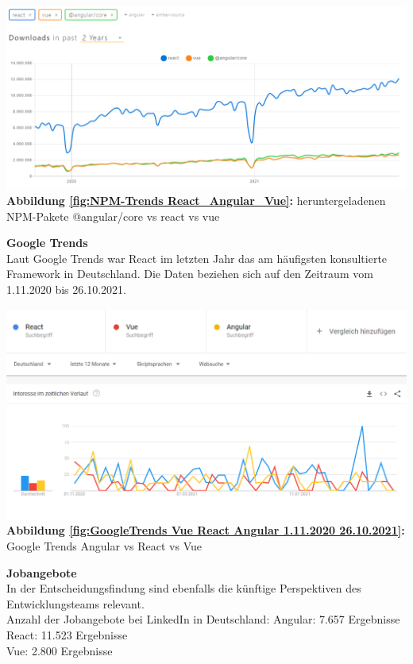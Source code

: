 \begin{center}
  \includegraphics[scale=0.4]{sources/NPM-Trends React_Angular_Vue}\label{fig:NPM-Trends React_Angular_Vue}\\
  \textbf{Abbildung \autoref{fig:NPM-Trends React_Angular_Vue}:} heruntergeladenen NPM-Pakete @angular/core vs react vs vue
    {\cite{NPM01}}
\end{center}

\textbf{Google Trends}\\
Laut Google Trends war React im letzten Jahr das am häufigsten konsultierte Framework in Deutschland.
Die Daten beziehen sich auf den Zeitraum vom 1.11.2020 bis 26.10.2021.
\begin{center}
  \includegraphics[scale=0.5]{sources/GoogleTrends Vue React Angular 1.11.2020 26.10.2021}\label{fig:GoogleTrends Vue React Angular 1.11.2020 26.10.2021}\\
  \textbf{Abbildung \autoref{fig:GoogleTrends Vue React Angular 1.11.2020 26.10.2021}:} Google Trends Angular vs React vs Vue
    {\cite{GO01}}
\end{center}

\textbf{Jobangebote}\\
In der Entscheidungsfindung sind ebenfalls die künftige Perspektiven des Entwicklungsteams relevant.
\\
Anzahl der Jobangebote bei LinkedIn in Deutschland:
Angular: 7.657 Ergebnisse
\\
React: 11.523 Ergebnisse
\\
Vue: 2.800 Ergebnisse



